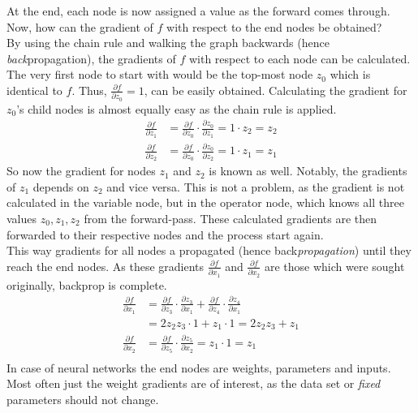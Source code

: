 At the end, each node is now assigned a value as the forward comes through. \\
Now, how can the gradient of $f$ with respect to the end nodes be obtained? \\
By using the chain rule and walking the graph backwards (hence \textit{back}propagation), the gradients of $f$ with respect to each node can be calculated.
The very first node to start with would be the top-most node $z_0$ which is identical to $f$.
Thus,  $\frac{\partial f}{\partial z_0} = 1$, can be easily obtained.
Calculating the gradient for $z_0$'s child nodes is almost equally easy as the chain rule is applied.
\begin{align}
    \frac{\partial f}{\partial z_1} & = \frac{\partial f}{\partial z_0} \cdot \frac{\partial z_0}{\partial z_1} = 1 \cdot z_2 = z_2 \\
    \frac{\partial f}{\partial z_2} & = \frac{\partial f}{\partial z_0} \cdot \frac{\partial z_0}{\partial z_2} = 1 \cdot z_1 = z_1
\end{align}
So now the gradient for nodes $z_1$ and $z_2$ is known as well.
Notably, the gradients of $z_1$ depends on $z_2$ and vice versa.
This is not a problem, as the gradient is not calculated in the variable node, but in the operator node, which knows all three values $z_0, z_1, z_2$ from the forward-pass.
These calculated gradients are then forwarded to their respective nodes and the process start again.\\
This way gradients for all nodes a propagated (hence back\textit{propagation}) until they reach the end nodes.
As these gradients $\frac{\partial f}{\partial x_1}$ and $\frac{\partial f}{\partial x_2}$ are those which were sought originally, backprop is complete.
\begin{align}
    \frac{\partial f}{\partial x_1} & = \frac{\partial f}{\partial z_3} \cdot \frac{\partial z_3}{\partial x_1} + \frac{\partial f}{\partial z_4} \cdot \frac{\partial z_4}{\partial x_1} \\
    & = 2 z_2 z_3 \cdot 1 + z_1 \cdot 1 = 2 z_2 z_3 + z_1 \\
    \frac{\partial f}{\partial x_2} & = \frac{\partial f}{\partial z_5} \cdot \frac{\partial z_5}{\partial x_2} = z_1 \cdot 1 = z_1 \\
\end{align}
In case of neural networks the end nodes are weights, parameters and inputs.
Most often just the weight gradients are of interest, as the data set or \textit{fixed} parameters should not change.

